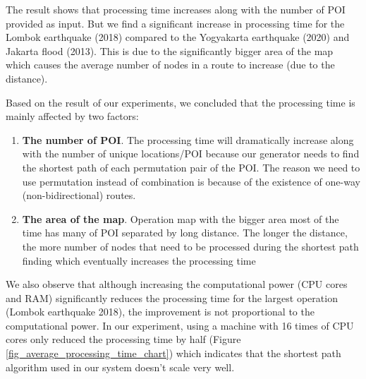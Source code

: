 \documentclass[conference]{IEEEtran}
\begin{document}
The result shows that processing time increases along with the number of POI provided as input. But we find a significant increase in processing time for the Lombok earthquake (2018) compared to the Yogyakarta earthquake (2020) and Jakarta flood (2013). This is due to the significantly bigger area of the map which causes the average number of nodes in a route to increase (due to the distance).

Based on the result of our experiments, we concluded that the processing time is mainly affected by two factors:

\begin{enumerate}
\item \textbf{The number of POI}. The processing time will dramatically increase along with the number of unique locations/POI because our generator needs to find the shortest path of each permutation pair of the POI. The reason we need to use permutation instead of combination is because of the existence of one-way (non-bidirectional) routes.
\item \textbf{The area of the map}. Operation map with the bigger area most of the time has many of POI separated by long distance. The longer the distance, the more number of nodes that need to be processed during the shortest path finding which eventually increases the processing time
\end{enumerate}

We also observe that although increasing the computational power (CPU cores and RAM) significantly reduces the processing time for the largest operation (Lombok earthquake 2018), the improvement is not proportional to the computational power. In our experiment, using a machine with 16 times of CPU cores only reduced the processing time by half (Figure \ref{fig_average_processing_time_chart}) which indicates that the shortest path algorithm used in our system doesn't scale very well.
\end{document}
